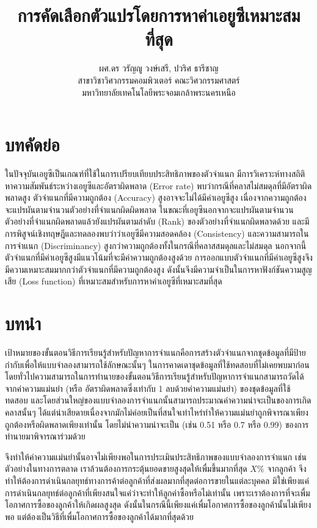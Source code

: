 \documentclass[twoside, twocolumn, 12pt]{article}
\title{การคัดเลือกตัวแปรโดยการหาค่าเอยูซีเหมาะสมที่สุด}
\author{%
\textsc{ผศ.ดร วรัญญู วงษ์เสรี, ปวริศ ธารีชาญ}\\[1ex]
\normalsize สาขาวิชาวิศวกรรมคอมพิวเตอร์ คณะวิศวกรรมศาสตร์  \\ มหาวิทยาลัยเทคโนโลยีพระจอมเกล้าพระนครเหนือ %
}
\date{}
\begin{document}
\maketitle
\section*{บทคัดย่อ}
\quad ในปัจจุบันเอยูซีเป็นเกณฑ์ที่ใช้ในการเปรียบเทียบประสิทธิภาพของตัวจำแนก มีการวิเคราะห์ทางสถิติหาความสัมพันธ์ระหว่างเอยูซีและอัตราผิดพลาด (Error rate) พบว่ากรณีที่คลาสไม่สมดุลที่มีอัตราผิดพลาดสูง ตัวจำแนกที่มีความถูกต้อง (Accuracy) สูงอาจจะไม่ได้มีค่าเอยูซีสูง เนื่องจากความถูกต้องจะแปรผันตามจำนวนตัวอย่างที่จำแนกผิดผิดพลาด ในขณะที่เอยูซีนอกจากจะแปรผันตามจำนวนตัวอย่างที่จำแนกผิดพลาดแล้วยังแปรผันตามลำดับ (Rank) ของตัวอย่างที่จำแนกผิดพลาดด้วย และมีการพิสูจน์เชิงทฤษฎีและทดลองพบว่าว่าเอยูซีมีความสอดคล้อง (Consistency) และความสามารถในการจำแนก (Discriminancy) สูงกว่าความถูกต้องทั้งในกรณีที่คลาสสมดุลและไม่สมดุล นอกจากนี้ตัวจำแนกที่มีค่าเอยูซีสูงมีแนวโน้มที่จะมีค่าความถูกต้องสูงด้วย การออกแบบตัวจำแนกที่มีค่าเอยูซีสูงจึงมีความเหมาะสมมากกว่าตัวจำแนกที่มีความถูกต้องสูง ดังนั้นจึงมีความจำเป็นในการหาฟังก์ชันความสูญเสีย (Loss function) ที่เหมาะสมสำหรับการหาค่าเอยูซีที่เหมาะสมที่สุด
\section{บทนำ}
เป้าหมายของขั้นตอนวิธีการเรียนรู้สำหรับปัญหาการจำแนกคือการสร้างตัวจำแนกจากชุดข้อมูลที่มีป้ายกำกับเพื่อให้แบบจำลองสามารถใช้ลักษณะนั้นๆ ในการคาดเดาชุดข้อมูลที่ใช้ทดสอบที่ไม่เคยพบมาก่อน โดยทั่วไปความสามารถในการทำนายของขั้นตอนวิธีการเรียนรู้สำหรับปัญหาการจำแนกสามารถวัดได้จากค่าความแม่นยำ (หรือ อัตราผิดพลาดซึ่งเท่ากับ 1 ลบด้วยค่าความแม่นยำ) ของชุดข้อมูลที่ใช้ทดสอบ และโดยส่วนใหญ่ของแบบจำลองการจำแนกนั้นสามารถประมาณค่าความน่าจะเป็นของการเกิดคลาสนั้นๆ ได้แต่น่าเสียดายเนื่องจากมักไม่ค่อยเป็นที่สนใจเท่าไหร่ทำให้ความแม่นยำถูกพิจารณาเพียงถูกต้องหรือผิดพลาดเพียงเท่านั้น โดยไม่นำความน่าจะเป็น (เช่น 0.51 หรือ 0.7 หรือ 0.99) ของการทำนายมาพิจารณาร่วมด้วย

จึงทำให้ค่าความแม่นยำนั้นอาจไม่เพียงพอในการประเมินประสิทธิภาพของแบบจำลองการจำแนก เช่นตัวอย่างในทางการตลาด เราล้วนต้องการกระตุ้นยอดขายสูงสุดให้เพื่มขึ้นมากที่สุด $X\%$ จากลูกค้า จึงทำให้ต้องการดําเนินกลยุทธ์ทางการค้าต่อลูกค้าที่ส่งผลมากที่สุดต่อการขายในแต่ละบุคคล มิใช่เพียงแค่การดําเนินกลยุทธ์ต่อลูกค้าที่เพียงสนใจแค่ว่าจะทำให้ลูกค่าซื้อหรือไม่เท่านั้น เพราะเราต้องการที่จะเพื่มโอกาศการซื้อของลูกค้าให้เกิดผลสูงสุด ดังนั้นในกรณีนี้เพียงแค่เพื่มโอกาศการซื้อของลูกค้านั้นไม่เพียงพอ แต่ต้องเป็นวิธีที่เพื่มโอกาศการซื้อของลูกค้าได้มากที่สุดด้วย
\end{document}

